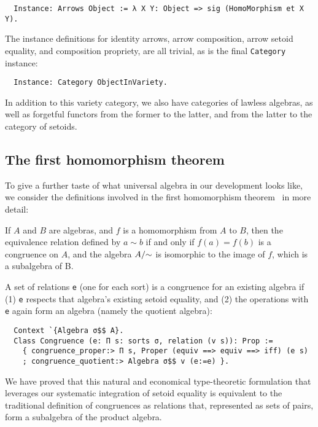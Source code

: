 \documentclass[a4paper,10pt,runningheads]{llncs}
\begin{document}
\begin{lstlisting}
  Instance: Arrows Object := λ X Y: Object => sig (HomoMorphism et X Y).
\end{lstlisting}

The instance definitions for identity arrows, arrow composition, arrow setoid equality, and composition propriety, are all trivial, as is the final \lstinline|Category| instance:
\begin{lstlisting}
  Instance: Category ObjectInVariety.
\end{lstlisting}

In addition to this variety category, we also have categories of lawless algebras, as well as forgetful functors from the former to the latter, and from the latter to the category of setoids.

\subsection{The first homomorphism theorem}
\label{homothm}

To give a further taste of what universal algebra in our development looks like, we consider the definitions involved in the first homomorphism theorem~\cite{meinke1993universal} in more detail:
\begin{theorem}
If $A$ and $B$ are algebras, and $f$ is a homomorphism from $A$ to $B$, then the equivalence relation defined by $a\sim b$ if and only if $f(a)=f(b)$ is a congruence on $A$, and the algebra $A/\hspace{-1mm}\sim$ is isomorphic to the image of $f$, which is a subalgebra of B.
\end{theorem}

A set of relations \lstinline|e| (one for each sort) is a congruence for an existing algebra if (1) \lstinline|e| respects that algebra's existing setoid equality, and (2) the operations with \lstinline|e| again form an algebra (namely the quotient algebra):
\begin{lstlisting}
  Context `{Algebra σ$$ A}.
  Class Congruence (e: Π s: sorts σ, relation (v s)): Prop :=
    { congruence_proper:> Π s, Proper (equiv ==> equiv ==> iff) (e s)
    ; congruence_quotient:> Algebra σ$$ v (e:=e) }.
\end{lstlisting}
We have proved that this natural and economical type-theoretic formulation that leverages our systematic integration of setoid equality is equivalent to the traditional definition of congruences as relations that, represented as sets of pairs, form a subalgebra of the product algebra.
\end{document}
